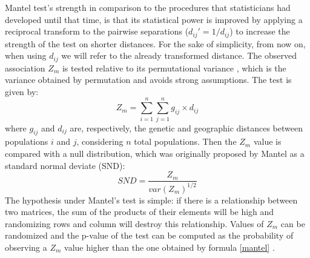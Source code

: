 \documentclass[a4paper, 12pt]{report}
\begin{document}
Mantel test's strength in comparison to the procedures that statisticians had developed until that time, is that its statistical power is improved by applying a reciprocal transform to the pairwise separations ($d_{ij}' = 1 / d_{ij}$) to increase the strength of the test on shorter distances. For the sake of simplicity, from now on, when using $d_{ij}$ we will refer to the already transformed distance. The observed association $Z_m$ is tested relative to its permutational variance \parencite{mantelDetectionDiseaseClustering1967}, which is the variance obtained by permutation and avoids strong assumptions. The test is given by:
\begin{equation}\label{mantel}
	Z_m = \sum^n_{i=1} \sum^n_{j=1} g_{ij} \times d_{ij}
\end{equation}
where $g_{ij}$ and $d_{ij}$ are, respectively, the genetic and geographic distances between populations $i$ and $j$, considering $n$ total populations. Then the $Z_{m}$ value is compared with a null distribution, which was originally proposed by Mantel as a standard normal deviate (SND):
\begin{equation}
	SND = \dfrac{Z_m}{var(Z_m)^{1/2}}
\end{equation}
The hypothesis under Mantel's test is simple: if there is a relationship between two matrices, the sum of the products of their elements will be high and randomizing rows and column will destroy this relationship. Values of $Z_m$ can be randomized and the p-value of the test can be computed as the probability of observing a $Z_m$ value higher than the one obtained by formula \ref{mantel} \parencite{diniz-filhoMantelTestPopulation2013}.
\end{document}
